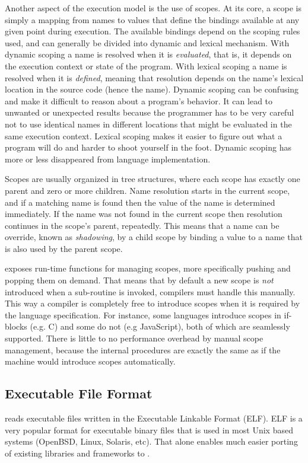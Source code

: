 Another aspect of the execution model is the use of scopes. At its core, a scope
is simply a mapping from names to values that define the bindings available at
any given point during execution. The available bindings depend on the scoping
rules used, and can generally be divided into dynamic and lexical
mechanism. With dynamic scoping a name is resolved when it is \emph{evaluated},
that is, it depends on the execution context or state of the program. With
lexical scoping a name is resolved when it is \emph{defined}, meaning that
resolution depends on the name's lexical location in the source code (hence the
name). Dynamic scoping can be confusing and make it difficult to reason about a
program's behavior. It can lead to unwanted or unexpected results because the
programmer has to be very careful not to use identical names in different
locations that might be evaluated in the same execution context. Lexical scoping
makes it easier to figure out what a program will do and harder to shoot
yourself in the foot. Dynamic scoping has more or less disappeared from language
implementation\cite{cse341}.

Scopes are usually organized in tree structures, where each scope has exactly
one parent and zero or more children. Name resolution starts in the current
scope, and if a matching name is found then the value of the name is determined
immediately. If the name was not found in the current scope then resolution
continues in the scope's parent, repeatedly. This means that a name can be
override, known as \textit{shadowing}, by a child scope by binding a value to a
name that is also used by the parent scope.

\thename{} exposes run-time functions for managing scopes, more specifically
pushing and popping them on demand. That means that by default a new scope is
\textit{not} introduced when a sub-routine is invoked, compilers must handle
this manually. This way a compiler is completely free to introduce scopes when
it is required by the language specification. For instance, some languages
introduce scopes in if-blocks (e.g. C) and some do not (e.g JavaScript), both of
which are seamlessly supported. There is little to no performance overhead by
manual scope management, because the internal procedures are exactly the same as
if the machine would introduce scopes automatically.

\subsection{Executable File Format}
\thename{} reads executable files written in the Executable Linkable Format
(ELF). ELF is a very popular format for executable binary files that is used in
most Unix based systems (OpenBSD, Linux, Solaris, etc\cite{NEEDED}). That alone
enables much easier porting of existing libraries and frameworks to
\thename{}.

